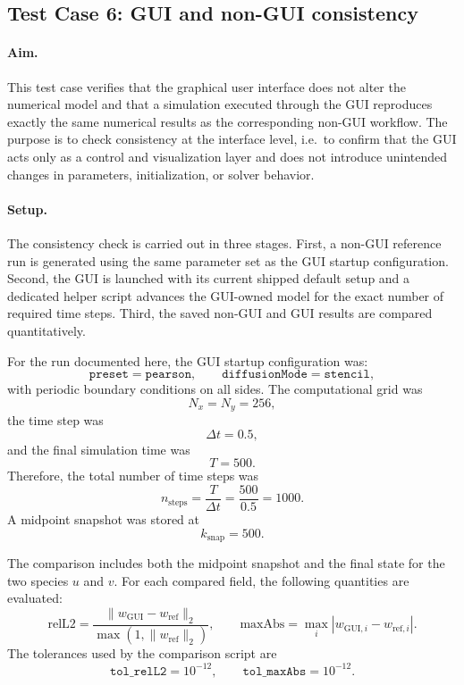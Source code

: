\subsection{Test Case 6: GUI and non-GUI consistency}
\label{sec:verification_testcase_gui_consistency}

\paragraph{Aim.}
This test case verifies that the graphical user interface does not alter the numerical model and that a simulation executed through the GUI reproduces exactly the same numerical results as the corresponding non-GUI workflow. The purpose is to check consistency at the interface level, i.e.\ to confirm that the GUI acts only as a control and visualization layer and does not introduce unintended changes in parameters, initialization, or solver behavior.

\paragraph{Setup.}
The consistency check is carried out in three stages. First, a non-GUI reference run is generated using the same parameter set as the GUI startup configuration. Second, the GUI is launched with its current shipped default setup and a dedicated helper script advances the GUI-owned model for the exact number of required time steps. Third, the saved non-GUI and GUI results are compared quantitatively.

For the run documented here, the GUI startup configuration was:
\[
\texttt{preset}=\texttt{pearson}, \qquad
\texttt{diffusionMode}=\texttt{stencil},
\]
with periodic boundary conditions on all sides. The computational grid was
\[
N_x = N_y = 256,
\]
the time step was
\[
\Delta t = 0.5,
\]
and the final simulation time was
\[
T = 500.
\]
Therefore, the total number of time steps was
\[
n_{\text{steps}} = \frac{T}{\Delta t} = \frac{500}{0.5} = 1000.
\]
A midpoint snapshot was stored at
\[
k_{\text{snap}} = 500.
\]

The comparison includes both the midpoint snapshot and the final state for the two species \(u\) and \(v\). For each compared field, the following quantities are evaluated:
\[
\mathrm{relL2} = \frac{\|w_{\mathrm{GUI}} - w_{\mathrm{ref}}\|_2}{\max(1,\|w_{\mathrm{ref}}\|_2)},
\qquad
\mathrm{maxAbs} = \max_i |w_{\mathrm{GUI},i} - w_{\mathrm{ref},i}|.
\]
The tolerances used by the comparison script are
\[
\texttt{tol\_relL2} = 10^{-12},
\qquad
\texttt{tol\_maxAbs} = 10^{-12}.
\]

